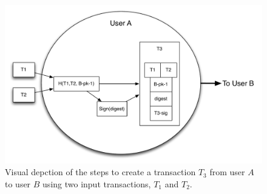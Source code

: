 \begin{center}
\begin{figure}
\includegraphics[scale=0.4]{./images/transaction_create.pdf}
\caption{Visual depction of the steps to create a transaction $T_3$ from user $A$ to user $B$ using two input transactions, $T_1$ and $T_2$.}
\end{figure}
\end{center}


